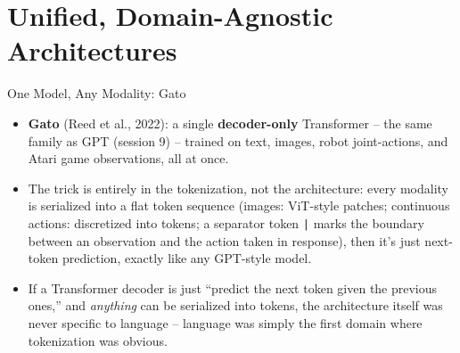 
\section{Unified, Domain-Agnostic Architectures}

\begin{vbframe}{One Model, Any Modality: Gato}
\begin{itemize}
  \item \textbf{Gato} (Reed et al., 2022): a single \textbf{decoder-only} Transformer -- the same family as GPT (session 9) -- trained on text, images, robot joint-actions, and Atari game observations, all at once.
  \item The trick is entirely in the tokenization, not the architecture: every modality is serialized into a flat token sequence (images: ViT-style patches; continuous actions: discretized into tokens; a separator token \texttt{|} marks the boundary between an observation and the action taken in response), then it's just next-token prediction, exactly like any GPT-style model.
  \item If a Transformer decoder is just ``predict the next token given the previous ones,'' and \emph{anything} can be serialized into tokens, the architecture itself was never specific to language -- language was simply the first domain where tokenization was obvious.
\end{itemize}
\end{vbframe}

